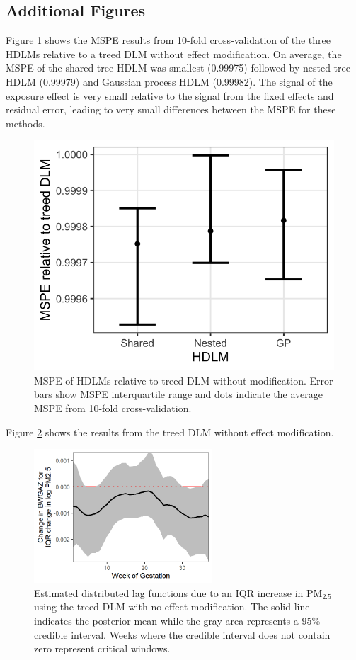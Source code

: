 \documentclass[12pt]{article}
\begin{document}
\subsection{Additional Figures}
Figure \ref{fig:mspe} shows the MSPE results from 10-fold cross-validation of the three HDLMs relative to a treed DLM without effect modification. On average, the MSPE of the shared tree HDLM was smallest (0.99975) followed by nested tree HDLM (0.99979) and Gaussian process HDLM (0.99982). The signal of the exposure effect is very small relative to the signal from the fixed effects and residual error, leading to very small differences between the MSPE for these methods.
\begin{figure}[!ht]
    \centering
    \includegraphics[width=.4\textwidth]{supp-img/mspe.png}
    \caption{MSPE of HDLMs relative to treed DLM without modification. Error bars show MSPE interquartile range and dots indicate the average MSPE from 10-fold cross-validation.}
    \label{fig:mspe}
\end{figure}

Figure \ref{fig:est_tdlm} shows the results from the treed DLM without effect modification.

\begin{figure}[!ht]
    \centering
    \includegraphics[height=5cm]{img/bwgaz_tdlm.png}
    \caption{Estimated distributed lag functions due to an IQR increase in PM$_{2.5}$ using the treed DLM with no effect modification. The solid line indicates the posterior mean while the gray area represents a 95\% credible interval. Weeks where the credible interval does not contain zero represent critical windows.}
    \label{fig:est_tdlm}
\end{figure}
\end{document}
